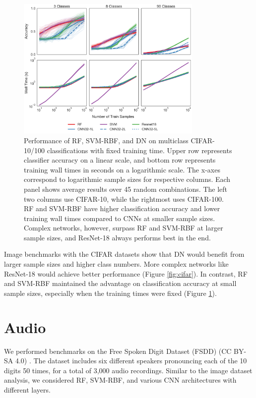 \begin{figure}[!htb]
\centering
\includegraphics[width=0.8\textwidth]{figures/cifar_st.pdf}
  \caption{Performance of RF, SVM-RBF, and DN on multiclass CIFAR-10/100 classifications with fixed training time.
  Upper row represents classifier accuracy on a linear scale, and bottom row represents training wall times in seconds on a logarithmic scale. The x-axes correspond to logarithmic sample sizes for respective columns. Each panel shows average results over 45 random combinations. The left two columns use CIFAR-10, while the rightmost uses CIFAR-100.
  RF and SVM-RBF have higher classification accuracy and lower training wall times compared to CNNs at smaller sample sizes. Complex networks, however, surpass RF and SVM-RBF at larger sample sizes, and ResNet-18 always performs best in the end.
  }
\label{fig:cifar_st}
\end{figure}
\vfil\eject

Image benchmarks with the CIFAR datasets show that DN would benefit from larger sample sizes and higher class numbers. More complex networks like ResNet-18 would achieve better performance (Figure \ref{fig:cifar}). In contrast, RF and SVM-RBF maintained the advantage on classification accuracy at small sample sizes, especially when the training times were fixed (Figure \ref{fig:cifar_st}). 

\section{Audio}
\label{audio}
We performed benchmarks on the Free Spoken Digit Dataset (FSDD) (CC BY-SA 4.0) \citep{FSDD}. The dataset includes six different speakers pronouncing each of the 10 digits 50 times, for a total of 3,000 audio recordings. Similar to the image dataset analysis, we considered RF, SVM-RBF, and various CNN architectures with different layers.

